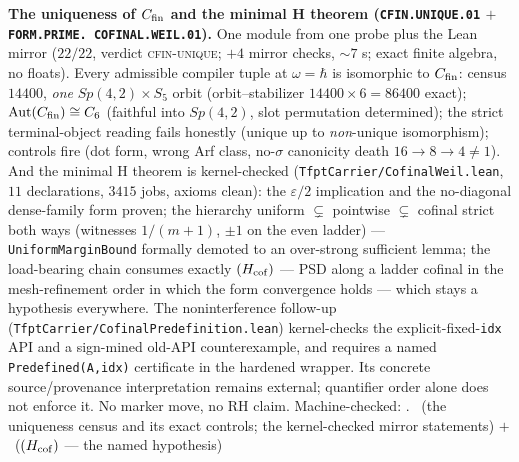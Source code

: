 \par\smallskip\noindent\textbf{The uniqueness of $C_{\rm fin}$
and the minimal H theorem (\texttt{CFIN.\allowbreak UNIQUE.01}
$+$ \texttt{FORM.\allowbreak PRIME.\allowbreak
COFINAL.\allowbreak WEIL.01}).}
One module from one probe plus the Lean mirror ($22/22$, verdict
\textsc{cfin-unique}; $+ 4$ mirror checks, ${\sim}7$ s; exact
finite algebra, no floats).  Every admissible compiler tuple at
$\omega = \hbar$ is isomorphic to $C_{\rm fin}$: census $14400$,
\emph{one} $Sp(4,2)\times S_5$ orbit (orbit--stabilizer $14400
\times 6 = 86400$ exact); $\mathrm{Aut}(C_{\rm fin}) \cong C_6$
(faithful into $Sp(4,2)$, slot permutation determined); the
strict terminal-object reading fails honestly (unique up to
\emph{non}-unique isomorphism); controls fire (dot form, wrong
Arf class, no-$\sigma$ canonicity death $16 \to 8 \to 4 \ne 1$).
And the minimal H theorem is kernel-checked
(\texttt{TfptCarrier/CofinalWeil.lean}, $11$ declarations, $3415$
jobs, axioms clean): the $\varepsilon/2$ implication and the
no-diagonal dense-family form proven; the hierarchy uniform
$\subsetneq$ pointwise $\subsetneq$ cofinal strict both ways
(witnesses $1/(m{+}1)$, $\pm1$ on the even ladder) ---
\texttt{UniformMarginBound} formally demoted to an over-strong
sufficient lemma; the load-bearing chain consumes exactly
$(H_{\rm cof})$ --- PSD along a ladder cofinal in the
mesh-refinement order in which the form convergence holds ---
which stays a hypothesis everywhere.  The
noninterference follow-up
(\texttt{TfptCarrier/CofinalPredefinition.lean}) kernel-checks the
explicit-fixed-\texttt{idx} API and a sign-mined old-API
counterexample, and requires a named
\texttt{Predefined(A,idx)} certificate in the hardened wrapper.
Its concrete source/provenance interpretation remains external;
quantifier order alone does not enforce it.  No marker move, no RH
claim.
Machine-checked: .
\mE\ (the uniqueness census and its exact controls; the
kernel-checked mirror statements) $+$ \mO\ ($(H_{\rm cof})$ ---
the named hypothesis)
\par\smallskip


